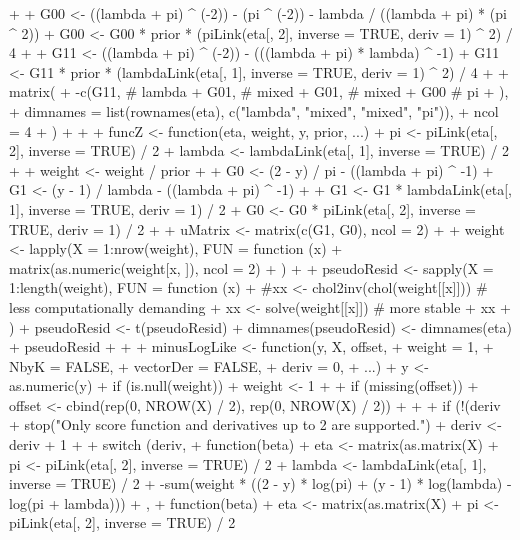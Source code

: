 \documentclass[
]{jss}
\newcommand{\1}{\mathcal{I}} \newcommand{\bZero}{\boldsymbol{0}}
\begin{document}
\begin{CodeChunk}
\begin{CodeInput}
{{+     
+     G00 <- ((lambda + pi) ^ (-2)) - (pi ^ (-2)) - lambda / ((lambda + pi) * (pi ^ 2))
+     G00 <- G00 * prior * (piLink(eta[, 2], inverse = TRUE, deriv = 1) ^ 2) / 4
+     
+     G11 <- ((lambda + pi) ^ (-2)) - (((lambda + pi) * lambda) ^ -1)
+     G11 <- G11 * prior * (lambdaLink(eta[, 1], inverse = TRUE, deriv = 1) ^ 2) / 4
+     
+     matrix(
+       -c(G11, # lambda
+          G01, # mixed
+          G01, # mixed
+          G00  # pi
+       ),
+       dimnames = list(rownames(eta), c("lambda", "mixed", "mixed", "pi")),
+       ncol = 4
+     )
+   }
+   
+   funcZ <- function(eta, weight, y, prior, ...) {
+     pi     <-     piLink(eta[, 2], inverse = TRUE) / 2
+     lambda <- lambdaLink(eta[, 1], inverse = TRUE) / 2
+     
+     weight <- weight / prior
+     
+     G0 <- (2 - y) / pi     - ((lambda + pi) ^ -1)
+     G1 <- (y - 1) / lambda - ((lambda + pi) ^ -1)
+     
+     G1 <- G1 * lambdaLink(eta[, 1], inverse = TRUE, deriv = 1) / 2
+     G0 <- G0 *     piLink(eta[, 2], inverse = TRUE, deriv = 1) / 2
+     
+     uMatrix <- matrix(c(G1, G0), ncol = 2)
+     
+     weight <- lapply(X = 1:nrow(weight), FUN = function (x) {
+       matrix(as.numeric(weight[x, ]), ncol = 2)
+     })
+     
+     pseudoResid <- sapply(X = 1:length(weight), FUN = function (x) {
+       #xx <- chol2inv(chol(weight[[x]])) # less computationally demanding
+       xx <- solve(weight[[x]]) # more stable
+       xx %
+     })
+     pseudoResid <- t(pseudoResid)
+     dimnames(pseudoResid) <- dimnames(eta)
+     pseudoResid
+   }
+   
+   minusLogLike <- function(y, X, offset,
+                            weight    = 1, 
+                            NbyK      = FALSE, 
+                            vectorDer = FALSE, 
+                            deriv     = 0, 
+                            ...) {
+     y <- as.numeric(y)
+     if (is.null(weight)) {
+       weight <- 1
+     }
+     if (missing(offset)) {
+       offset <- cbind(rep(0, NROW(X) / 2), rep(0, NROW(X) / 2))
+     }
+     
+     if (!(deriv %
+       stop("Only score function and derivatives up to 2 are supported.")
+     deriv <- deriv + 1 
+     
+     switch (deriv,
+       function(beta) {
+         eta <- matrix(as.matrix(X) %
+         pi     <-     piLink(eta[, 2], inverse = TRUE) / 2
+         lambda <- lambdaLink(eta[, 1], inverse = TRUE) / 2
+         -sum(weight * ((2 - y) * log(pi) + (y - 1) * log(lambda) - log(pi + lambda)))
+       },
+       function(beta) {
+         eta <- matrix(as.matrix(X) %
+         pi     <-     piLink(eta[, 2], inverse = TRUE) / 2
}}}
\end{CodeInput}
\end{CodeChunk}
\end{document}
